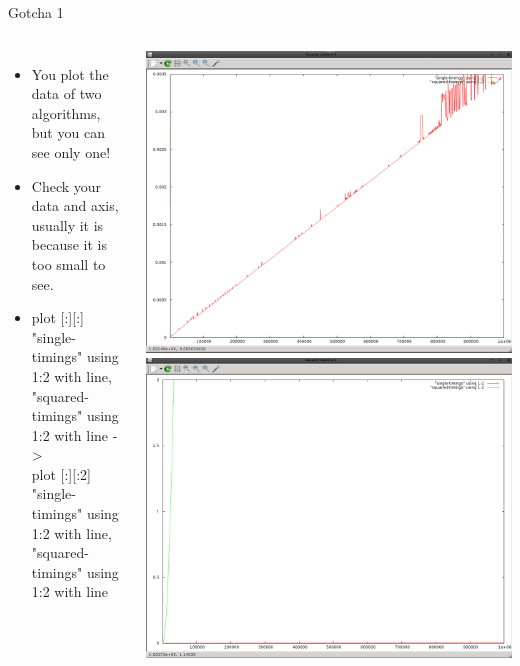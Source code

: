 \documentclass{beamer}
\begin{document}
\begin{frame}{Gotcha 1}
\begin{columns}
\begin{itemize}
\item You plot the data of two algorithms, but you can see only one!
\item <2-> Check your data and axis, usually it is because it is too small to see.
\item <3-> {\tiny plot [:][:] "single-timings" using 1:2 with line, "squared-timings" using 1:2 with line -> \\
plot [:][:2] "single-timings" using 1:2 with line, "squared-timings" using 1:2 with line }

\end{itemize}
 {
\includegraphics[width=1.0\textwidth]{../imgs/timing-gotcha1.png}
}
 {
\includegraphics[width=1.0\textwidth]{../imgs/timing-gotcha2.png}
}
\end{columns}
\end{frame}
\end{document}
